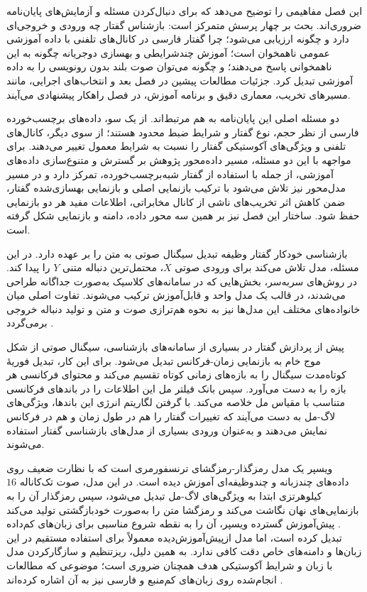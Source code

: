 
این فصل مفاهیمی را توضیح می‌دهد که برای دنبال‌کردن مسئله و آزمایش‌های پایان‌نامه ضروری‌اند. بحث بر چهار پرسش متمرکز است: بازشناس گفتار چه ورودی و خروجی‌ای دارد و چگونه ارزیابی می‌شود؛ چرا گفتار فارسی در کانال‌های تلفنی با داده آموزشی عمومی ناهمخوان است؛ آموزش چندشرایطی و بهسازی دوجریانه چگونه به این ناهمخوانی پاسخ می‌دهند؛ و چگونه می‌توان صوت بلند بدون رونویسی را به داده آموزشی تبدیل کرد. جزئیات مطالعات پیشین در فصل بعد و انتخاب‌های اجرایی، مانند مسیر‌های تخریب، معماری دقیق و برنامه آموزش، در فصل راهکار پیشنهادی می‌آیند.

دو مسئله اصلی این پایان‌نامه به هم مرتبط‌اند. از یک سو، داده‌های برچسب‌خورده فارسی از نظر حجم، نوع گفتار و شرایط ضبط محدود هستند؛ از سوی دیگر، کانال‌های تلفنی و  ویژگی‌های آکوستیکی گفتار را نسبت به شرایط معمول تغییر می‌دهند. برای مواجهه با این دو مسئله، مسیر داده‌محور پژوهش بر گسترش و متنوع‌سازی داده‌های آموزشی، از جمله با استفاده از گفتار شبه‌برچسب‌خورده، تمرکز دارد و در مسیر مدل‌محور نیز تلاش می‌شود با ترکیب بازنمایی اصلی و بازنمایی بهسازی‌شده گفتار، ضمن کاهش اثر تخریب‌های ناشی از کانال مخابراتی، اطلاعات مفید هر دو بازنمایی حفظ شود. ساختار این فصل نیز بر همین سه محور داده، دامنه و بازنمایی شکل گرفته است.



بازشناسی خودکار گفتار وظیفه تبدیل سیگنال صوتی به متن را بر عهده دارد. در این مسئله، مدل تلاش می‌کند برای ورودی صوتی $X$، محتمل‌ترین دنباله متنی $Y$ را پیدا کند. در روش‌های سربه‌سر، بخش‌هایی که در سامانه‌های کلاسیک به‌صورت جداگانه طراحی می‌شدند، در قالب یک مدل واحد و قابل‌آموزش ترکیب می‌شوند. تفاوت اصلی میان خانواده‌های مختلف این مدل‌ها نیز به نحوه هم‌ترازی صوت و متن و تولید دنباله خروجی برمی‌گردد .

پیش از پردازش گفتار در بسیاری از سامانه‌های بازشناسی، سیگنال صوتی از شکل موج خام به بازنمایی زمان-فرکانس تبدیل می‌شود. برای این کار، تبدیل فوریهٔ کوتاه‌مدت سیگنال را به بازه‌های زمانی کوتاه تقسیم می‌کند و محتوای فرکانسی هر بازه را به دست می‌آورد. سپس بانک فیلتر مل این اطلاعات را در باندهای فرکانسی متناسب با مقیاس مل خلاصه می‌کند. با گرفتن لگاریتم انرژی این باندها، ویژگی‌های لاگ-مل به دست می‌آیند که تغییرات گفتار را هم در طول زمان و هم در فرکانس نمایش می‌دهند و به‌عنوان ورودی بسیاری از مدل‌های بازشناسی گفتار استفاده می‌شوند.

ویسپر یک مدل رمزگذار-رمزگشای ترنسفورمری است که با نظارت ضعیف روی داده‌های چندزبانه و چندوظیفه‌ای آموزش دیده است. در این مدل، صوت تک‌کاناله $16$ کیلوهرتزی ابتدا به ویژگی‌های لاگ-مل تبدیل می‌شود، سپس رمزگذار آن را به بازنمایی‌های نهان نگاشت می‌کند و رمزگشا متن را به‌صورت خودبازگشتی تولید می‌کند . پیش‌آموزش گسترده ویسپر، آن را به نقطه شروع مناسبی برای زبان‌های کم‌داده تبدیل کرده است، اما مدل ازپیش‌آموزش‌دیده معمولاً برای استفاده مستقیم در این زبان‌ها و دامنه‌های خاص دقت کافی ندارد. به همین دلیل، ریزتنظیم و سازگارکردن مدل با زبان و شرایط آکوستیکی هدف همچنان ضروری است؛ موضوعی که مطالعات انجام‌شده روی زبان‌های کم‌منبع و فارسی نیز به آن اشاره کرده‌اند .

